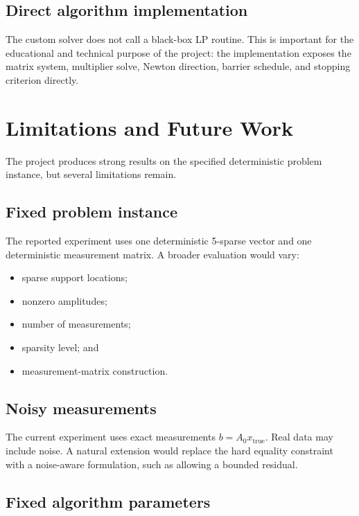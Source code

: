 \documentclass[11pt]{article}
\begin{document}
\subsection{Direct algorithm implementation}

The custom solver does not call a black-box LP routine. This is important for the educational and technical purpose of the project: the implementation exposes the matrix system, multiplier solve, Newton direction, barrier schedule, and stopping criterion directly.

\section{Limitations and Future Work}
The project produces strong results on the specified deterministic problem instance, but several limitations remain.

\subsection{Fixed problem instance}

The reported experiment uses one deterministic 5-sparse vector and one deterministic measurement matrix. A broader evaluation would vary:
\begin{itemize}[leftmargin=1.5em]
  \item sparse support locations;
  \item nonzero amplitudes;
  \item number of measurements;
  \item sparsity level; and
  \item measurement-matrix construction.
\end{itemize}

\subsection{Noisy measurements}

The current experiment uses exact measurements $b=A_0x_{\text{true}}$. Real data may include noise. A natural extension would replace the hard equality constraint with a noise-aware formulation, such as allowing a bounded residual.

\subsection{Fixed algorithm parameters}
\end{document}
